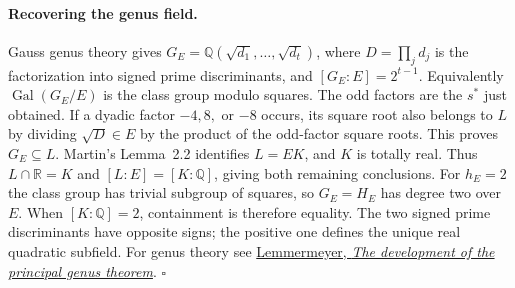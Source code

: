 \paragraph{Recovering the genus field.}
Gauss genus theory gives $G_E=\mathbb Q(\sqrt{d_1},\ldots,\sqrt{d_t})$, where $D=\prod_j d_j$ is the factorization into signed prime discriminants, and $[G_E:E]=2^{t-1}$. Equivalently $\operatorname{Gal}(G_E/E)$ is the class group modulo squares. The odd factors are the $s^*$ just obtained. If a dyadic factor $-4,8,$ or $-8$ occurs, its square root also belongs to $L$ by dividing $\sqrt D\in E$ by the product of the odd-factor square roots. This proves $G_E\subseteq L$. Martin's Lemma~2.2 identifies $L=EK$, and $K$ is totally real. Thus $L\cap\mathbb R=K$ and $[L:E]=[K:\mathbb Q]$, giving both remaining conclusions. For $h_E=2$ the class group has trivial subgroup of squares, so $G_E=H_E$ has degree two over $E$. When $[K:\mathbb Q]=2$, containment is therefore equality. The two signed prime discriminants have opposite signs; the positive one defines the unique real quadratic subfield. For genus theory see \href{https://www.math.purdue.edu/~jlipman/MA598/Lemmermeyer-principal\%20genus.pdf}{Lemmermeyer, \emph{The development of the principal genus theorem}}. \hfill$\square$

